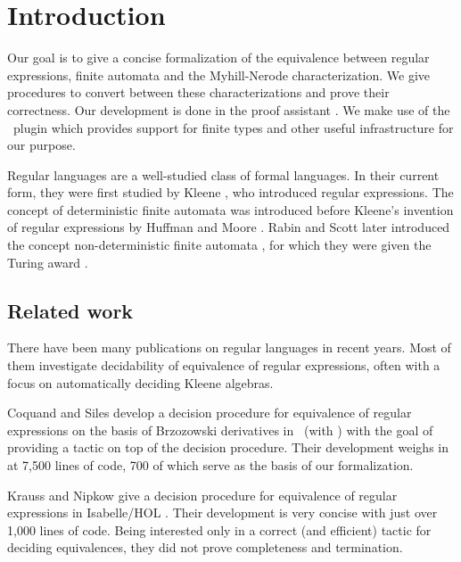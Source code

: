 \chapter{Introduction}
\label{chap:intro}

Our goal is to give a concise formalization of the equivalence between regular expressions, finite automata and the Myhill-Nerode characterization. 
We give procedures to convert between these characterizations and prove their correctness.
Our development is done in the proof assistant \coq.
We make use of the \ssreflect\ plugin which provides support for finite types and other useful infrastructure for our purpose.


Regular languages are a well-studied class of formal languages. 
In their current form, they were first studied by Kleene \cite{KleeneNets}, who introduced regular expressions. 
The concept of deterministic finite automata was introduced before Kleene's invention of regular expressions by Huffman \cite{Huffman1954161} and Moore \cite{Moore56}. 
Rabin and Scott later introduced the concept non-deterministic finite automata \cite{Rabin:1959:FAD:1661907.1661909}, for which they were given the Turing award \cite{Ashenhurst:1987:ATA:27609}.



\section{Related work}

There have been many publications on regular languages in recent years.
Most of them investigate decidability of equivalence of regular expressions, often with a focus on automatically deciding Kleene algebras.


Coquand and Siles develop a decision procedure for equivalence of regular expressions \cite{DBLP:conf/cpp/CoquandS11} on the basis of Brzozowski derivatives \cite{DBLP:journals/jacm/Brzozowski64} in \coq\ (with \ssreflect) with the goal of providing a tactic on top of the decision procedure. Their development weighs in at 7,500 lines of code, 700 of which serve as the basis of our formalization.


Krauss and Nipkow give a decision procedure for equivalence of regular expressions in Isabelle/HOL \cite{DBLP:journals/jar/KraussN12}. Their development is very concise with just over 1,000 lines of code. Being interested only in a correct (and efficient) tactic for deciding equivalences, they did not prove completeness and termination.


